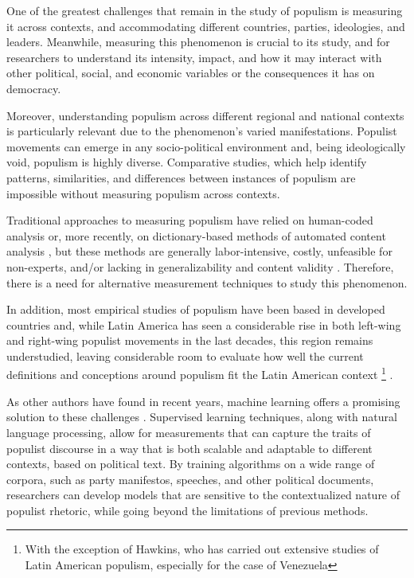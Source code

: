 \documentclass[12pt,letterpaper]{article}
\begin{document}
\vspace{.25cm}

One of the greatest challenges that remain in the study of populism is measuring it across contexts, and accommodating different countries, parties, ideologies, and leaders. Meanwhile, measuring this phenomenon is crucial to its study, and for researchers to understand its intensity, impact, and how it may interact with other political, social, and economic variables or the consequences it has on democracy. 

Moreover, understanding populism across different regional and national contexts is particularly relevant due to the phenomenon's varied manifestations. Populist movements can emerge in any socio-political environment and, being ideologically void, populism is highly diverse. Comparative studies, which help identify patterns, similarities, and differences between instances of populism are impossible without measuring populism across contexts. 

Traditional approaches to measuring populism have relied on human-coded analysis\autocite{hawkinsChavezPopulistMeasuring2009}\autocite{jagersPopulismPoliticalCommunication2007} 
or, more recently, on dictionary-based methods of automated content analysis\autocite{rooduijnMeasuringPopulismComparing2011}\autocite{bonikowskiPopulistStyleAmerican2016}
, but these methods are generally labor-intensive, costly, unfeasible for non-experts, and/or lacking in generalizability and content validity\autocite{grimmerTextDataPromise2013} . Therefore, there is a need for alternative measurement techniques to study this phenomenon. 

In addition, most empirical studies of populism\autocite{abromeitCriticalReviewRecent2017} have been based in developed countries and, while Latin America has seen a considerable rise in both left-wing and right-wing populist movements in the last decades, this region remains understudied, leaving considerable room to evaluate how well the current definitions and conceptions around populism fit the Latin American context 
\footnote{With the exception of Hawkins, who has carried out extensive studies of Latin American populism, especially for the case of Venezuela} . 

As other authors have found in recent years, machine learning offers a promising solution to these challenges \autocite{coccoHowPopulistAre2022}\autocite{daiMeasuringPopulismContext} . Supervised learning techniques, along with natural language processing, allow for measurements that can capture the traits of populist discourse in a way that is both scalable and adaptable to different contexts, based on political text. By training algorithms on a wide range of corpora, such as party manifestos, speeches, and other political documents, researchers can develop models that are sensitive to the contextualized nature of populist rhetoric, while going beyond the limitations of previous methods.
\end{document}
